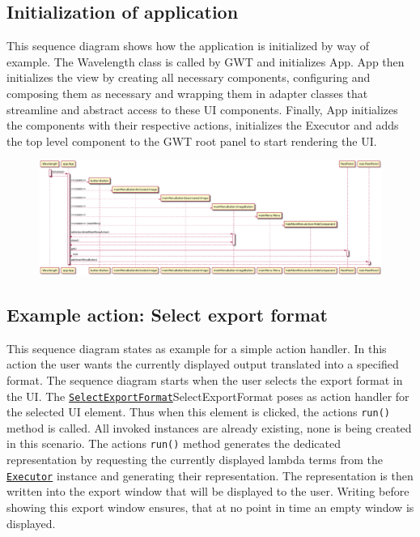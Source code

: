 \subsection{Initialization of application}
This sequence diagram shows how the application is initialized by way of example. The Wavelength class is called by GWT and initializes App. 
App then initializes the view by creating all necessary components, configuring and composing them as necessary and wrapping them in adapter classes that streamline and abstract access to these UI components.
Finally, App initializes the components with their respective actions, initializes the Executor and adds the top level component to the GWT root panel to start rendering the UI.

\begin{figure}[H]
	\centering
	\includegraphics[width=\textwidth]{sequenceDiagrams/initialization}
\end{figure}

\subsection{Example action: Select export format}
This sequence diagram states as example for a simple action handler.
In this action the user wants the currently displayed output translated into a specified format. The sequence diagram starts when the user selects the export format in the UI. 
The \texttt{\hyperref[type:edu.kit.wavelength.client.view.action.SelectExportFormat]{SelectExportFormat}}SelectExportFormat poses as action handler for the selected UI element. Thus when this element is clicked, the actions \texttt{run()} method is called. All invoked instances are already existing, none is being created in this scenario.
The actions \texttt{run()} method generates the dedicated representation by requesting the currently displayed lambda terms from the \texttt{\hyperref[type:edu.kit.wavelength.client.view.execution.Executor]{Executor}} instance and generating their representation.
The representation is then written into the export window that will be displayed to the user. Writing before showing this export window ensures, that at no point in time an empty window is displayed.

